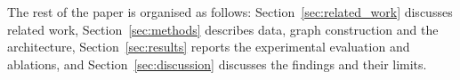 \documentclass[review,3p,times,11pt, ]{elsarticle} %
\begin{document}
The rest of the paper is organised as follows: Section~\ref{sec:related_work} discusses related work, Section~\ref{sec:methods} describes data, graph construction and the architecture, Section~\ref{sec:results} reports the experimental evaluation and ablations, and Section~\ref{sec:discussion} discusses the findings and their limits.


%
\end{document}
